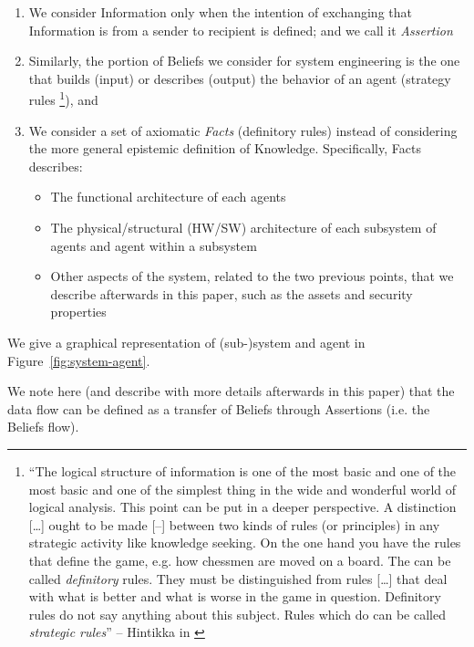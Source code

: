 \begin{enumerate}
	\item We consider Information only when the intention of exchanging 
		that Information is from a sender to 
		recipient is defined; and we call it \emph{Assertion}  
	\item Similarly, the portion of Beliefs we consider for system
		engineering is the one that builds (input) or describes
		(output) the behavior of an agent (strategy rules
		\footnote{``The logical structure of information is one of the
		most basic and one of the most basic and one of the simplest
		thing in the wide and wonderful world of logical analysis. This
		point can be put in a deeper perspective. A distinction
		[\ldots] ought to be made [--] between two kinds of rules (or
		principles) in any strategic activity like knowledge seeking.
		On the one hand you have the rules that define the game, e.g.
		how chessmen are moved on a board. The can be called
		\emph{definitory} rules.  They must be distinguished from rules
		[\ldots] that deal with what is better and what is worse in the
		game in question.  Definitory rules do not say anything about
		this subject. Rules which do can be called \emph{strategic
		rules}'' -- Hintikka in \autocite{Hintikka1993Information}}),
		and
	\item We consider a set of axiomatic \emph{Facts} (definitory rules) instead
		of considering the more general epistemic definition of
		Knowledge. Specifically, Facts describes:
		\begin{itemize}
			\item The functional architecture of each agents
			\item The physical/structural (HW/SW) architecture of each
				subsystem of agents and agent within a
				subsystem
			\item Other aspects of the system, related to the two previous points, that we
				describe afterwards in this paper, such as
				the assets and security properties 
		\end{itemize}
\end{enumerate}
We give a graphical representation of (sub-)system and agent in Figure~\ref{fig:system-agent}.

We note here (and describe with more details afterwards in this paper) that the
data flow can be defined as a transfer of Beliefs through Assertions (i.e. the
Beliefs flow).

